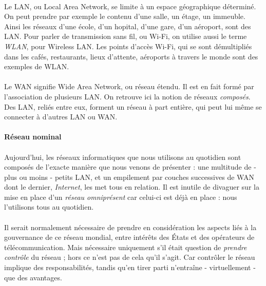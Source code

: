 \paragraph{} Le LAN, ou Local Area Network, se limite à un espace géographique déterminé. On peut prendre
par exemple le contenu d'une salle, un étage, un immeuble. Ainsi les réseaux d'une école, d'un
hopital, d'une gare, d'un aéroport, sont des LAN. Pour parler de transmission sans fil, ou
Wi-Fi, on utilise aussi le terme \emph{WLAN}, pour Wireless LAN. Les points d'accès Wi-Fi, qui se
sont démultipliés dans les cafés, restaurants, lieux d'attente, aéroports à travers le monde
sont des exemples de WLAN.

\paragraph{} Le WAN signifie Wide Area Network, ou réseau étendu. Il est en fait formé par
l'association de plusieurs LAN. On retrouve ici la notion de réseaux \emph{composés}. Des LAN,
reliés entre eux, forment un réseau à part entière, qui peut lui même se connecter à d'autres
LAN ou WAN.


\paragraph{Réseau nominal} 

\paragraph{} Aujourd'hui, les réseaux informatiques que nous utilisons au quotidien sont composés
de l'exacte manière que nous venons de présenter : une multitude de - plus ou moins - petits LAN, et un empilement
par couches successives de WAN dont le dernier, \emph{Internet}, les met tous en relation. Il est inutile de divaguer
sur la mise en place d'un \emph{réseau omniprésent} car celui-ci est déjà en place : nous l'utilisons tous au quotidien.

\paragraph{} Il serait normalement nécessaire de prendre en considération les aspects liés à la gouvernance de ce réseau 
mondial, entre intérêts des États et des opérateurs de télécommunication. Mais nécessaire uniquement s'il était question
de \emph{prendre contrôle} du réseau ; hors ce n'est pas de cela qu'il s'agit. Car contrôler le réseau implique des 
responsabilités, tandis qu'en tirer parti n'entraîne - virtuellement - que des avantages.

